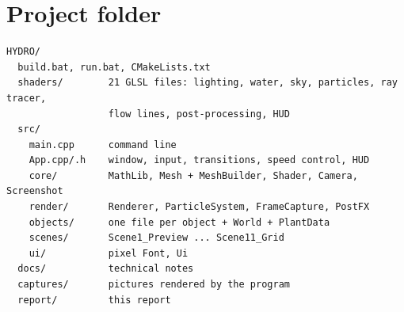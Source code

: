 \documentclass[11pt,a4paper]{report}
\begin{document}
\section*{Project folder}
\noindent\begin{minipage}{\linewidth}
\begin{lstlisting}[language={}]
HYDRO/
  build.bat, run.bat, CMakeLists.txt
  shaders/        21 GLSL files: lighting, water, sky, particles, ray tracer,
                  flow lines, post-processing, HUD
  src/
    main.cpp      command line
    App.cpp/.h    window, input, transitions, speed control, HUD
    core/         MathLib, Mesh + MeshBuilder, Shader, Camera, Screenshot
    render/       Renderer, ParticleSystem, FrameCapture, PostFX
    objects/      one file per object + World + PlantData
    scenes/       Scene1_Preview ... Scene11_Grid
    ui/           pixel Font, Ui
  docs/           technical notes
  captures/       pictures rendered by the program
  report/         this report
\end{lstlisting}
\end{minipage}
\end{document}
